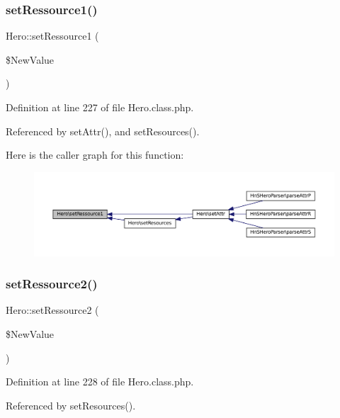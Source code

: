 \subsubsection{\texorpdfstring{set\+Ressource1()}{setRessource1()}}
{\footnotesize\ttfamily Hero\+::set\+Ressource1 (\begin{DoxyParamCaption}\item[{}]{\$\+New\+Value }\end{DoxyParamCaption})}



Definition at line 227 of file Hero.\+class.\+php.



Referenced by set\+Attr(), and set\+Resources().

Here is the caller graph for this function\+:\nopagebreak
\begin{figure}[H]
\begin{center}
\leavevmode
\includegraphics[width=350pt]{class_hero_ab322ecf2edd6cec527d0d2715a1cfa1c_icgraph}
\end{center}
\end{figure}
\mbox{\label{class_hero_a11a02ea8b3c6109f3951fac1c37288ec}} 
\subsubsection{\texorpdfstring{set\+Ressource2()}{setRessource2()}}
{\footnotesize\ttfamily Hero\+::set\+Ressource2 (\begin{DoxyParamCaption}\item[{}]{\$\+New\+Value }\end{DoxyParamCaption})}



Definition at line 228 of file Hero.\+class.\+php.



Referenced by set\+Resources().


